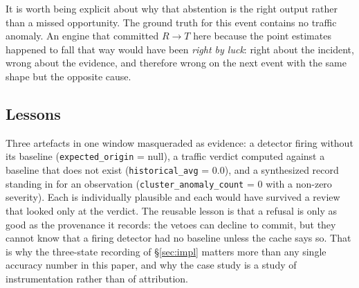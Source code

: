 It is worth being explicit about why that abstention is the right output
rather than a missed opportunity. The ground truth for this event contains
no traffic anomaly. An engine that committed $R\to T$ here because the
point estimates happened to fall that way would have been \emph{right by
luck}: right about the incident, wrong about the evidence, and therefore
wrong on the next event with the same shape but the opposite cause.

\subsection{Lessons}

Three artefacts in one window masqueraded as evidence: a detector firing
without its baseline (\texttt{expected\_origin} = null), a traffic
verdict computed against a baseline that does not exist
(\texttt{historical\_avg} = 0.0), and a synthesized record standing in
for an observation (\texttt{cluster\_anomaly\_count} = 0 with a non-zero
severity). Each is individually plausible and each would have survived a
review that looked only at the verdict. The reusable lesson is that a
refusal is only as good as the provenance it records: the vetoes can
decline to commit, but they cannot know that a firing detector had no
baseline unless the cache says so. That is why the three-state recording
of \S\ref{sec:impl} matters more than any single accuracy number in this
paper, and why the case study is a study of instrumentation rather than
of attribution.
